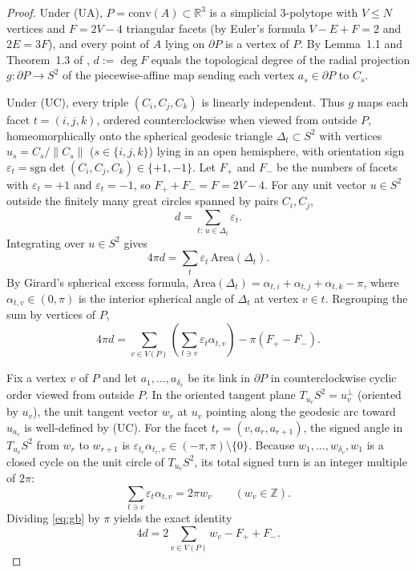 \documentclass[11pt]{article}
\begin{document}
\begin{proof}
Under \textup{(UA)}, $P=\mathrm{conv}(A)\subset\mathbb{R}^3$ is a simplicial $3$-polytope with $V\le N$ vertices and $F=2V-4$ triangular facets (by Euler's formula $V-E+F=2$ and $2E=3F$), and every point of $A$ lying on $\partial P$ is a vertex of $P$. By Lemma~1.1 and Theorem~1.3 of \cite{Bihan2026}, $d:=\deg F$ equals the topological degree of the radial projection $g:\partial P\to S^2$ of the piecewise-affine map sending each vertex $a_s\in\partial P$ to $C_s$.

Under \textup{(UC)}, every triple $(C_i,C_j,C_k)$ is linearly independent. Thus $g$ maps each facet $t=(i,j,k)$, ordered counterclockwise when viewed from outside $P$, homeomorphically onto the spherical geodesic triangle $\Delta_t\subset S^2$ with vertices $u_s = C_s/\|C_s\|$ ($s\in\{i,j,k\}$) lying in an open hemisphere, with orientation sign $\varepsilon_t=\mathrm{sgn}\det(C_i,C_j,C_k)\in\{+1,-1\}$. Let $F_+$ and $F_-$ be the numbers of facets with $\varepsilon_t=+1$ and $\varepsilon_t=-1$, so $F_++F_-=F=2V-4$. For any unit vector $u\in S^2$ outside the finitely many great circles spanned by pairs $C_i,C_j$,
\[
d = \sum_{t:\, u\in\Delta_t} \varepsilon_t.
\]
Integrating over $u\in S^2$ gives
\[
4\pi d = \sum_t \varepsilon_t\,\mathrm{Area}(\Delta_t).
\]
By Girard's spherical excess formula, $\mathrm{Area}(\Delta_t)=\alpha_{t,i}+\alpha_{t,j}+\alpha_{t,k}-\pi$, where $\alpha_{t,v}\in(0,\pi)$ is the interior spherical angle of $\Delta_t$ at vertex $v\in t$. Regrouping the sum by vertices of $P$,
\begin{equation}\label{eq:gb}
4\pi d = \sum_{v\in V(P)} \left(\sum_{t\ni v} \varepsilon_t \alpha_{t,v}\right) - \pi(F_+ - F_-).
\end{equation}

Fix a vertex $v$ of $P$ and let $a_1,\dots,a_{\delta_v}$ be its link in $\partial P$ in counterclockwise cyclic order viewed from outside $P$. In the oriented tangent plane $T_{u_v}S^2 = u_v^\perp$ (oriented by $u_v$), the unit tangent vector $w_r$ at $u_v$ pointing along the geodesic arc toward $u_{a_r}$ is well-defined by \textup{(UC)}. For the facet $t_r=(v,a_r,a_{r+1})$, the signed angle in $T_{u_v}S^2$ from $w_r$ to $w_{r+1}$ is $\varepsilon_{t_r}\alpha_{t_r,v}\in(-\pi,\pi)\setminus\{0\}$. Because $w_1,\dots,w_{\delta_v},w_1$ is a closed cycle on the unit circle of $T_{u_v}S^2$, its total signed turn is an integer multiple of $2\pi$:
\[
\sum_{t\ni v} \varepsilon_t \alpha_{t,v} = 2\pi w_v \qquad (w_v\in\mathbb{Z}).
\]
Dividing \eqref{eq:gb} by $\pi$ yields the exact identity
\begin{equation}\label{eq:exact}
4d = 2\sum_{v\in V(P)} w_v - F_+ + F_-.
\end{equation}


\end{proof}
\end{document}
